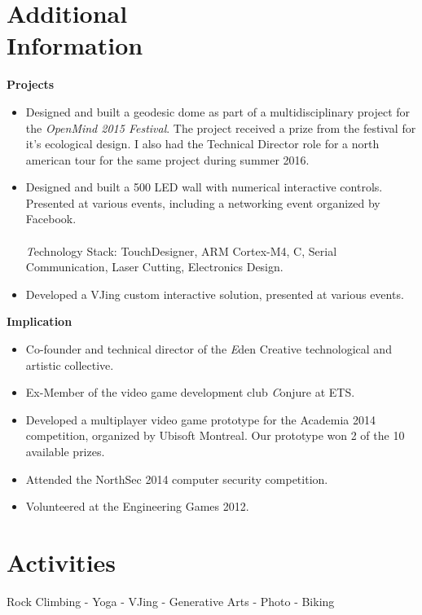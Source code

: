 \documentclass[margin,line]{res}
\begin{document}
\begin{resume}

\section{\sc Additional\\ Information}
{\bf Projects}\hfill
\begin{itemize}
\item Designed and built a geodesic dome as part of a multidisciplinary project for the \emph{OpenMind 2015 Festival}. The project received a prize from the festival for it's ecological design. I also had the Technical Director role for a north american tour for the same project during summer 2016.
\item Designed and built a 500 LED wall with numerical interactive controls. Presented at various  events, including a networking event organized by Facebook.
\\\\{\emph Technology Stack:} TouchDesigner, ARM Cortex-M4, C, Serial Communication, Laser Cutting, Electronics Design.
\item Developed a VJing custom interactive solution, presented at various events.
\end{itemize}
{\bf Implication} \hfill
\begin{itemize}
\item Co-founder and technical director of the {\emph Eden Creative} technological and artistic collective.
\item Ex-Member of the video game development club {\emph Conjure} at ETS.
\item Developed a multiplayer video game prototype for the Academia 2014 competition, organized by Ubisoft Montreal. Our prototype won 2 of the 10 available prizes.
\item Attended the NorthSec 2014 computer security competition.
\item Volunteered at the Engineering Games 2012.
\end{itemize}


\section{\sc Activities}
Rock Climbing - Yoga - VJing - Generative Arts - Photo - Biking


\end{resume}
\end{document}
